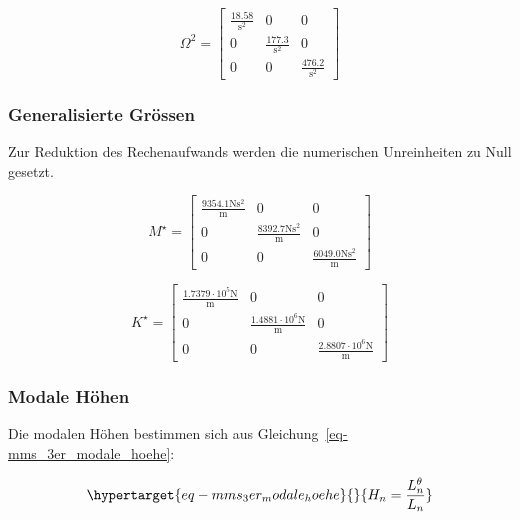 \documentclass[
  letterpaper,
  DIV=11]{scrreprt}
\begin{document}
\begin{equation}\Omega^{2} = \left[\begin{matrix}\frac{18.58}{\text{s}^{2}} & 0 & 0\\0 & \frac{177.3}{\text{s}^{2}} & 0\\0 & 0 & \frac{476.2}{\text{s}^{2}}\end{matrix}\right]\end{equation}

\hypertarget{generalisierte-gruxf6ssen-1}{%
\subsubsection{Generalisierte
Grössen}\label{generalisierte-gruxf6ssen-1}}

Zur Reduktion des Rechenaufwands werden die numerischen Unreinheiten zu
Null gesetzt.

\begin{equation}M^{\star} = \left[\begin{matrix}\frac{9354.1 \text{N} \text{s}^{2}}{\text{m}} & 0 & 0\\0 & \frac{8392.7 \text{N} \text{s}^{2}}{\text{m}} & 0\\0 & 0 & \frac{6049.0 \text{N} \text{s}^{2}}{\text{m}}\end{matrix}\right]\end{equation}

\begin{equation}K^{\star} = \left[\begin{matrix}\frac{1.7379 \cdot 10^{5} \text{N}}{\text{m}} & 0 & 0\\0 & \frac{1.4881 \cdot 10^{6} \text{N}}{\text{m}} & 0\\0 & 0 & \frac{2.8807 \cdot 10^{6} \text{N}}{\text{m}}\end{matrix}\right]\end{equation}

\hypertarget{modale-huxf6hen-1}{%
\subsubsection{Modale Höhen}\label{modale-huxf6hen-1}}

Die modalen Höhen bestimmen sich aus
Gleichung~\ref{eq-mms_3er_modale_hoehe}:

\begin{equation}\protect\hypertarget{eq-mms_3er_modale_hoehe}{}{
H_n = \frac{L_n^\theta}{L_n}
}\label{eq-mms_3er_modale_hoehe}\end{equation}
\end{document}
